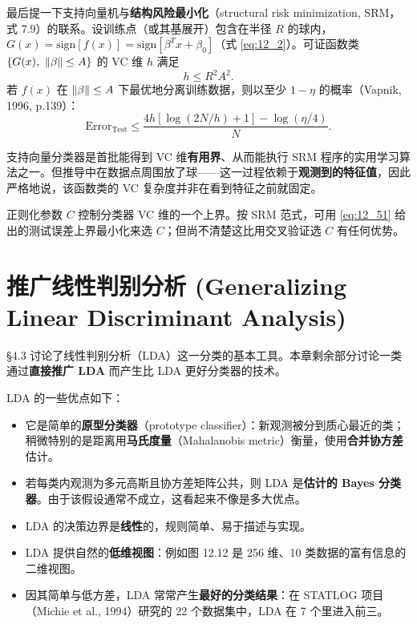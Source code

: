 \begin{remark}[与结构风险最小化的联系]
最后提一下支持向量机与\textbf{结构风险最小化}（structural risk minimization, SRM，式 7.9）的联系。设训练点（或其基展开）包含在半径 $R$ 的球内，$G(x)=\mathrm{sign}[f(x)]=\mathrm{sign}[\beta^T x+\beta_0]$（式 \ref{eq:12_2}）。可证函数类 $\{G(x),\ \left\lVert\beta\right\rVert\le A\}$ 的 VC 维 $h$ 满足
\begin{equation}
h \le R^2 A^2. \label{eq:12_50}
\end{equation}
若 $f(x)$ 在 $\left\lVert\beta\right\rVert\le A$ 下最优地分离训练数据，则以至少 $1-\eta$ 的概率（Vapnik, 1996, p.139）：
\begin{equation}
\mathrm{Error}_{\mathrm{Test}} \le \frac{4h[\log(2N/h) + 1] - \log(\eta/4)}{N}. \label{eq:12_51}
\end{equation}
\end{remark}

\begin{remark}
支持向量分类器是首批能得到 VC 维\textbf{有用界}、从而能执行 SRM 程序的实用学习算法之一。但推导中在数据点周围放了球——这一过程依赖于\textbf{观测到的特征值}，因此严格地说，该函数类的 VC 复杂度并非在看到特征之前就固定。

正则化参数 $C$ 控制分类器 VC 维的一个上界。按 SRM 范式，可用 \ref{eq:12_51} 给出的测试误差上界最小化来选 $C$；但尚不清楚这比用交叉验证选 $C$ 有任何优势。
\end{remark}

\section{推广线性判别分析 (Generalizing Linear Discriminant Analysis)}

§4.3 讨论了线性判别分析（LDA）这一分类的基本工具。本章剩余部分讨论一类通过\textbf{直接推广 LDA} 而产生比 LDA 更好分类器的技术。

LDA 的一些优点如下：

\begin{itemize}
\item 它是简单的\textbf{原型分类器}（prototype classifier）：新观测被分到质心最近的类；稍微特别的是距离用\textbf{马氏度量}（Mahalanobis metric）衡量，使用\textbf{合并协方差}估计。
\item 若每类内观测为多元高斯且协方差矩阵公共，则 LDA 是\textbf{估计的 Bayes 分类器}。由于该假设通常不成立，这看起来不像是多大优点。
\item LDA 的决策边界是\textbf{线性}的，规则简单、易于描述与实现。
\item LDA 提供自然的\textbf{低维视图}：例如图 12.12 是 256 维、10 类数据的富有信息的二维视图。
\item 因其简单与低方差，LDA 常常产生\textbf{最好的分类结果}：在 STATLOG 项目（Michie et al., 1994）研究的 22 个数据集中，LDA 在 7 个里进入前三。
\end{itemize}

